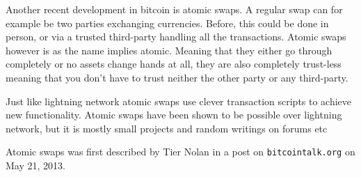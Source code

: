 
Another recent development in bitcoin is atomic swaps.
A regular swap can for example be two parties exchanging currencies. Before,
this could be done in person, or via a trusted third-party handling all the
transactions. Atomic swaps however is as the name implies atomic. Meaning that
they either go through completely or no assets change hands at all, they are
also completely trust-less meaning that you don't have to trust neither the
other party or any third-party.

Just like lightning network atomic swaps use clever transaction scripts to
achieve new functionality. Atomic swaps have been shown to be possible over
lightning network, but it is mostly small projects and random writings on
forums etc

Atomic swaps was first described by Tier Nolan in a post on
\texttt{bitcointalk.org} on May 21, 2013.\cite{tier_nolan}

